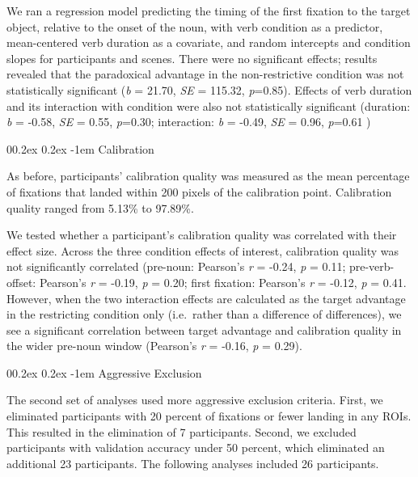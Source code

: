 \documentclass[
  man,floatsintext]{apa6}
\makeatletter
\let\oldparagraph\paragraph
\renewcommand{\paragraph}[1]{\oldparagraph{#1}\mbox{}}
\renewcommand{\paragraph}{\@startsection{paragraph}{4}{\parindent}%
  {0\baselineskip \@plus 0.2ex \@minus 0.2ex}%
  {-1em}%
  {\normalfont\normalsize\bfseries\itshape\typesectitle}}
\makeatother
\begin{document}
We ran a regression model predicting the timing of the first fixation to the target object, relative to the onset of the noun, with verb condition as a predictor, mean-centered verb duration as a covariate, and random intercepts and condition slopes for participants and scenes. There were no significant effects; results revealed that the paradoxical advantage in the non-restrictive condition was not statistically significant (\emph{b} = 21.70, \emph{SE} = 115.32, \emph{p}=0.85). Effects of verb duration and its interaction with condition were also not statistically significant (duration: \emph{b} = -0.58, \emph{SE} = 0.55, \emph{p}=0.30; interaction: \emph{b} = -0.49, \emph{SE} = 0.96, \emph{p}=0.61 )

\paragraph{Calibration}\label{calibration-1}

As before, participants' calibration quality was measured as the mean percentage of fixations that landed within 200 pixels of the calibration point. Calibration quality ranged from 5.13\% to 97.89\%.

We tested whether a participant's calibration quality was correlated with their effect size. Across the three condition effects of interest, calibration quality was not significantly correlated (pre-noun: Pearson's \emph{r} = -0.24, \emph{p} = 0.11; pre-verb-offset: Pearson's \emph{r} = -0.19, \emph{p} = 0.20; first fixation: Pearson's \emph{r} = -0.12, \emph{p} = 0.41. However, when the two interaction effects are calculated as the target advantage in the restricting condition only (i.e.~rather than a difference of differences), we see a significant correlation between target advantage and calibration quality in the wider pre-noun window (Pearson's \emph{r} = -0.16, \emph{p} = 0.29).

\paragraph{Aggressive Exclusion}\label{aggressive-exclusion-1}

The second set of analyses used more aggressive exclusion criteria. First, we eliminated participants with 20 percent of fixations or fewer landing in any ROIs. This resulted in the elimination of 7 participants. Second, we excluded participants with validation accuracy under 50 percent, which eliminated an additional 23 participants. The following analyses included 26 participants.
\end{document}
